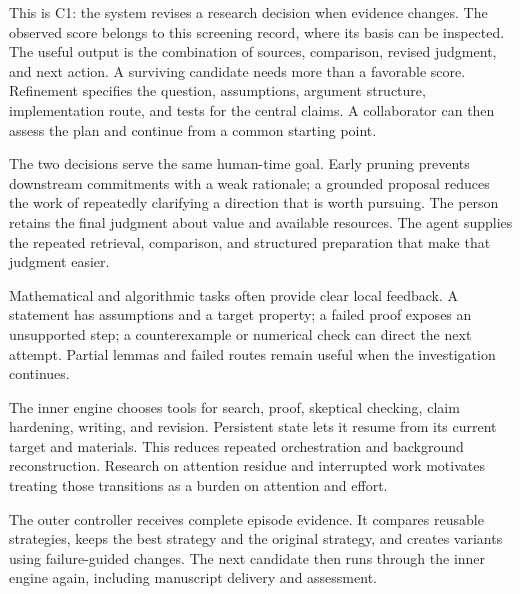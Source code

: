 This is C1: the system revises a research decision when evidence changes. The observed score belongs to this screening record, where its basis can be inspected. The useful output is the combination of sources, comparison, revised judgment, and next action.
A surviving candidate needs more than a favorable score. Refinement specifies the question, assumptions, argument structure, implementation route, and tests for the central claims. A collaborator can then assess the plan and continue from a common starting point.

The two decisions serve the same human-time goal. Early pruning prevents downstream commitments with a weak rationale; a grounded proposal reduces the work of repeatedly clarifying a direction that is worth pursuing. The person retains the final judgment about value and available resources. The agent supplies the repeated retrieval, comparison, and structured preparation that make that judgment easier.

Mathematical and algorithmic tasks often provide clear local feedback. A statement has assumptions and a target property; a failed proof exposes an unsupported step; a counterexample or numerical check can direct the next attempt. Partial lemmas and failed routes remain useful when the investigation continues.

The inner engine chooses tools for search, proof, skeptical checking, claim hardening, writing, and revision. Persistent state lets it resume from its current target and materials. This reduces repeated orchestration and background reconstruction. Research on attention residue and interrupted work motivates treating those transitions as a burden on attention and effort.

The outer controller receives complete episode evidence. It compares reusable strategies, keeps the best strategy and the original strategy, and creates variants using failure-guided changes. The next candidate then runs through the inner engine again, including manuscript delivery and assessment.

